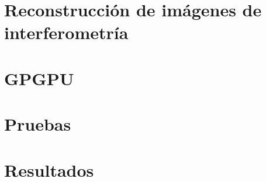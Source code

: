 \chapter{Reconstrucción de imágenes de interferometría}
\label{cap:imagesynthesisinterferometry}

\chapter{GPGPU}
\label{cap:gpgpu}

\chapter{Pruebas}
\label{cap:pruebas}

\chapter{Resultados}
\label{cap:resultados}
